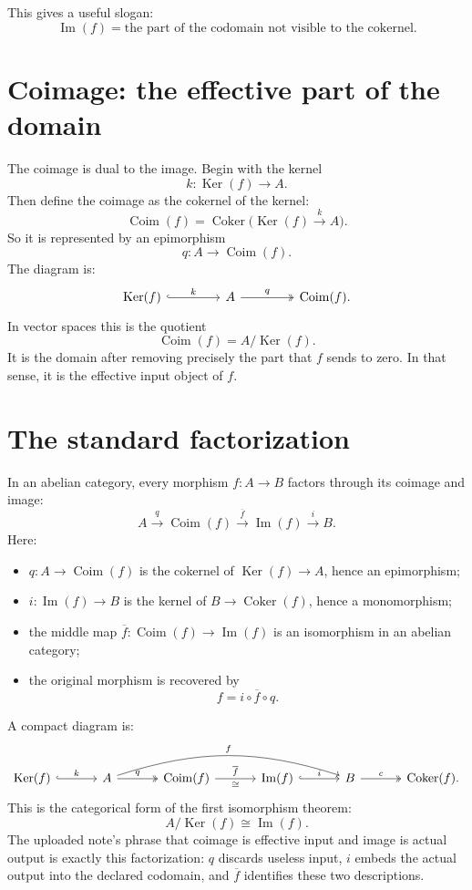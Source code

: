 This gives a useful slogan:
\[
  \operatorname{Im}(f)=\text{the part of the codomain not visible to the cokernel.}
\]

\section{Coimage: the effective part of the domain}

The coimage is dual to the image.  Begin with the kernel
\[
  k:\operatorname{Ker}(f)\to A.
\]
Then define the coimage as the cokernel of the kernel:
\[
  \operatorname{Coim}(f)=\operatorname{Coker}\bigl(\operatorname{Ker}(f)\xrightarrow{k}A\bigr).
\]
So it is represented by an epimorphism
\[
  q:A\to \operatorname{Coim}(f).
\]
The diagram is:
\[
\begin{tikzcd}[column sep=4.2em]
\operatorname{Ker}(f) \arrow[r, "k", hook] & A \arrow[r, "q", two heads] & \operatorname{Coim}(f).
\end{tikzcd}
\]
In vector spaces this is the quotient
\[
  \operatorname{Coim}(f)=A/\operatorname{Ker}(f).
\]
It is the domain after removing precisely the part that \(f\) sends to zero.  In that sense, it is the effective input object of \(f\).

\section{The standard factorization}

In an abelian category, every morphism \(f:A\to B\) factors through its coimage and image:
\[
  A \xrightarrow{q} \operatorname{Coim}(f)
  \xrightarrow{\overline f}
  \operatorname{Im}(f)
  \xrightarrow{i} B.
\]
Here:
\begin{itemize}
  \item \(q:A\to \operatorname{Coim}(f)\) is the cokernel of \(\operatorname{Ker}(f)\to A\), hence an epimorphism;
  \item \(i:\operatorname{Im}(f)\to B\) is the kernel of \(B\to \operatorname{Coker}(f)\), hence a monomorphism;
  \item the middle map \(\overline f:\operatorname{Coim}(f)\to \operatorname{Im}(f)\) is an isomorphism in an abelian category;
  \item the original morphism is recovered by
  \[
    f=i\circ \overline f\circ q.
  \]
\end{itemize}
A compact diagram is:
\[
\begin{tikzcd}[column sep=3.3em,row sep=3.2em]
\operatorname{Ker}(f) \arrow[r, "k", hook] & A \arrow[r, "q", two heads] \arrow[rrr, bend left=18, "f"] & \operatorname{Coim}(f) \arrow[r, "\overline f", "\cong"'] & \operatorname{Im}(f) \arrow[r, "i", hook] & B \arrow[r, "c", two heads] & \operatorname{Coker}(f).
\end{tikzcd}
\]
This is the categorical form of the first isomorphism theorem:
\[
  A/\operatorname{Ker}(f)\cong \operatorname{Im}(f).
\]
The uploaded note's phrase that coimage is effective input and image is actual output is exactly this factorization: \(q\) discards useless input, \(i\) embeds the actual output into the declared codomain, and \(\overline f\) identifies these two descriptions.

